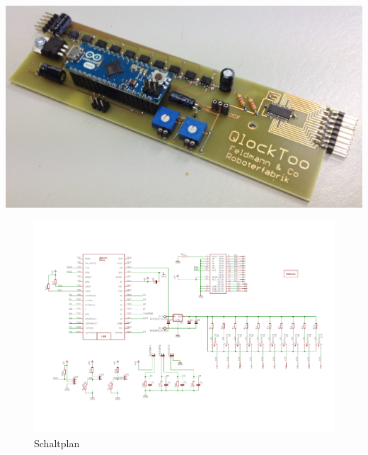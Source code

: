 {
\centering 
\includegraphics[width=\textwidth]{Abbildungen/Elektronik/Platine_bestueckt} 
}


\begin{landscape}
	\begin{figure}[H]
		\centering
		\includegraphics[width=22cm]{Abbildungen/QlockToo_Schaltplan}
		\caption[Schaltplan]{Schaltplan}
		\label{fig:Schaltplan}
		
	\end{figure}
\end{landscape}
